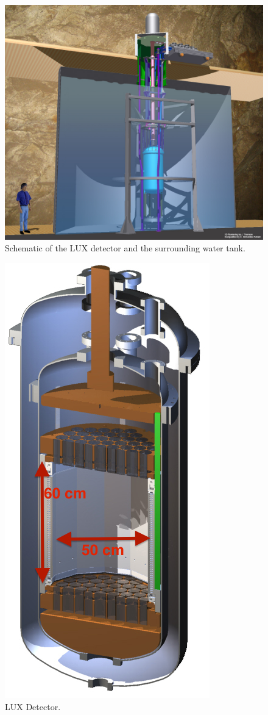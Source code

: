  \begin{figure}[h!]\centering
\includegraphics[scale=0.35]{Chapter_LUX_Det/Davis_3D_tank.jpg}
\caption{Schematic of the LUX detector and the surrounding water tank.}
\label{fig:LUX_Davis}
\end{figure}

 \begin{figure}[h!]\centering
\includegraphics[scale=0.5]{Chapter_LUX_Det/LUX_half_rendering_white.jpg}
\caption{LUX Detector.}
\label{fig:LUX_TPC}
\end{figure}

